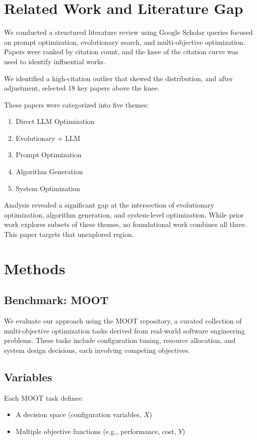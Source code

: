 \documentclass[sigconf,nonacm]{acmart}
\begin{document}
\section{Related Work and Literature Gap}

We conducted a structured literature review using Google Scholar queries focused on prompt optimization, evolutionary search, and multi-objective optimization. Papers were ranked by citation count, and the knee of the citation curve was used to identify influential works.

We identified a high-citation outlier that skewed the distribution, and after adjustment, selected 18 key papers above the knee.

These papers were categorized into five themes:
\begin{enumerate}
\item Direct LLM Optimization
\item Evolutionary + LLM
\item Prompt Optimization
\item Algorithm Generation
\item System Optimization
\end{enumerate}

Analysis revealed a significant gap at the intersection of evolutionary optimization, algorithm generation, and system-level optimization. While prior work explores subsets of these themes, no foundational work combines all three. This paper targets that unexplored region.

\section{Methods}

\subsection{Benchmark: MOOT}

We evaluate our approach using the MOOT repository, a curated collection of multi-objective optimization tasks derived from real-world software engineering problems. These tasks include configuration tuning, resource allocation, and system design decisions, each involving competing objectives.

\subsection{Variables}

Each MOOT task defines:
\begin{itemize}
\item A decision space (configuration variables, $X$)
\item Multiple objective functions (e.g., performance, cost, $Y$)
\end{itemize}
\end{document}
